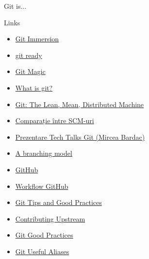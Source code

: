 \documentclass{beamer}
\begin{document}
\begin{frame}{Git is...}
  \begin{center}
  \end{center}
\end{frame}

\begin{frame}{Links}
  \begin{itemize}
    \item \href{http://gitimmersion.com/}{Git Immersion}
    \item \href{http://gitready.com/}{git ready}
    \item \href{http://www-cs-students.stanford.edu/~blynn/gitmagic/index.html}{Git Magic}
    \item \href{http://aht.github.com/whatisgit/\#/cover}{What is git?}
    \item \href{http://www.slideshare.net/err/git-machine}{Git: The Lean, Mean, Distributed Machine}
    \item \href{http://en.wikipedia.org/wiki/Comparison\_of\_revision\_control\_software}{Comparație între SCM-uri}
    \item \href{http://talks.rosedu.org/prezentari/prezentarea03}{Prezentare Tech Talks Git (Mircea Bardac)}
    \item \href{http://nvie.com/posts/a-successful-git-branching-model/}{A branching model}
    \item \href{http://github.com}{GitHub}
    \item \href{http://www.eqqon.com/index.php/Collaborative\_Github\_Workflow}{Workflow GitHub}
    \item \href{http://techblog.rosedu.org/git-good-practices.html}{Git Tips and Good Practices}
    \item \href{http://techblog.rosedu.org/contributing-upstream.html}{Contributing Upstream}
    \item \href{http://techblog.rosedu.org/git-good-practices.html}{Git Good Practices}
    \item \href{http://techblog.rosedu.org/git-useful-aliases.html}{Git Useful Aliases}
  \end{itemize}
\end{frame}
\end{document}
